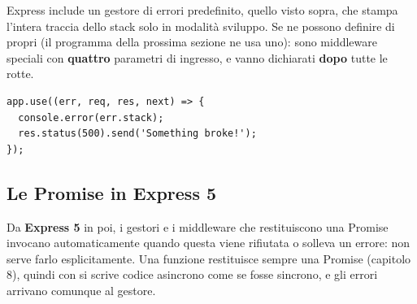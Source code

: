 Express include un gestore di errori predefinito, quello visto sopra, che
stampa l'intera traccia dello stack solo in modalità sviluppo. Se ne possono
definire di propri (il programma della prossima sezione ne usa uno): sono
middleware speciali con \textbf{quattro} parametri di ingresso, e vanno
dichiarati \textbf{dopo} tutte le rotte.

\begin{lstlisting}[style=js]
app.use((err, req, res, next) => {
  console.error(err.stack);
  res.status(500).send('Something broke!');
});
\end{lstlisting}


\subsection{Le Promise in Express 5}

Da \textbf{Express 5} in poi, i gestori e i middleware che restituiscono una
Promise invocano automaticamente  quando questa viene
rifiutata o solleva un errore: non serve farlo esplicitamente. Una funzione
 restituisce sempre una Promise (capitolo 8), quindi con
 si scrive codice asincrono come se fosse sincrono, e gli errori
arrivano comunque al gestore.

